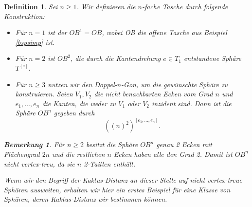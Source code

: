 \documentclass[12pt,titlepage,twoside,cleardoublepage]{article}
\theoremstyle{nummermitklammern}
\newtheorem{definition}[temp]{Definition}
\newtheorem{bemerkung}[temp]{Bemerkung}
\newtheorem{definition}[zahl]{Definition}
\newtheorem{bemerkung}[zahl]{Bemerkung}
\numberwithin{equation}{section}
\begin{document}
\begin{definition}
Sei $n\geq 1$. Wir definieren die \emph{$n$-fache Tasche} durch folgende Konstruktion:
\begin{itemize}
\item Für $n=1$ ist der $OB^1=OB$, wobei OB die offene Tasche aus Beispiel \ref{bspsimp} ist.
\item Für $n=2$ ist $OB^2$, die durch die Kantendrehung $e\in T_1$ entstandene Sphäre $T^{[e]}$.
\item Für $n\geq 3$ nutzen wir den Doppel-$n$-Gon, um die gewünschte Sphäre zu konstruieren. Seien $V_1,V_2$ die nicht benachbarten Ecken vom Grad $n$ und $e_1,\ldots, e_n$ die Kanten, die weder zu $V_1$ oder $V_2$ inzident sind. Dann ist die Sphäre $OB^n$ gegeben durch
\[
{((n)^2)}^{[e_1,\ldots,e_n]}.
\]
\end{itemize}
\begin{bemerkung}
Für $n\geq 2$ besitzt die Sphäre $OB^n$ genau 2 Ecken mit Flächengrad $2n$ und die restlichen $n$ Ecken haben alle den Grad 2. Damit ist $OB^n$ nicht vertex-treu, da sie $n$ 2-Taillen enthält.
\end{bemerkung}
Wenn wir den Begriff der Kaktus-Distanz an dieser Stelle auf nicht vertex-treue Sphären ausweiten, erhalten wir hier ein erstes Beispiel für eine Klasse von Sphären, deren Kaktus-Distanz wir bestimmen können. 

\end{definition}
\end{document}

